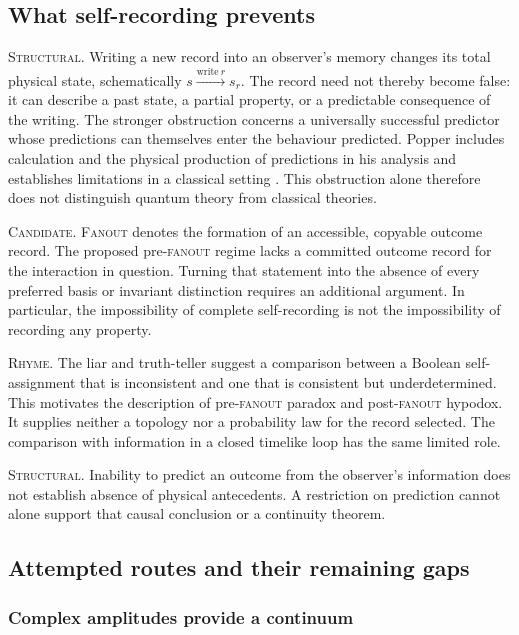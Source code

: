 \subsection{What self-recording prevents}
\label{app:continuity-self-recording}

\noindent\textsc{Structural.}
Writing a new record into an observer's memory changes its total physical
state, schematically $s\xrightarrow{\mathrm{write}\ r}s_r$. The record need
not thereby become false: it can describe a past state, a partial property,
or a predictable consequence of the writing. The stronger obstruction
concerns a universally successful predictor whose predictions can themselves
enter the behaviour predicted. Popper includes calculation and the physical
production of predictions in his analysis and establishes limitations in a
classical setting \autocite{Popper1950a}. This obstruction alone therefore
does not distinguish quantum theory from classical theories.

\noindent\textsc{Candidate.}
\textsc{Fanout} denotes the formation of an accessible, copyable outcome
record. The proposed pre-\textsc{fanout} regime lacks a committed outcome
record for the interaction in question. Turning that statement into the
absence of every preferred basis or invariant distinction requires an
additional argument. In particular, the impossibility of complete
self-recording is not the impossibility of recording any property.

\noindent\textsc{Rhyme.}
The liar and truth-teller suggest a comparison between a Boolean
self-assignment that is inconsistent and one that is consistent but
underdetermined. This
motivates the description of pre-\textsc{fanout} paradox and post-\textsc{fanout}
hypodox. It supplies neither a topology nor a probability law for the record
selected. The comparison with information in a closed timelike loop has
the same limited role.

\noindent\textsc{Structural.}
Inability to predict an outcome from the observer's information does not
establish absence of physical antecedents. A restriction on prediction
cannot alone support that causal conclusion or a continuity theorem.

\subsection{Attempted routes and their remaining gaps}
\label{app:continuity-routes}

\subsubsection{Complex amplitudes provide a continuum}
\label{app:continuity-complex}

